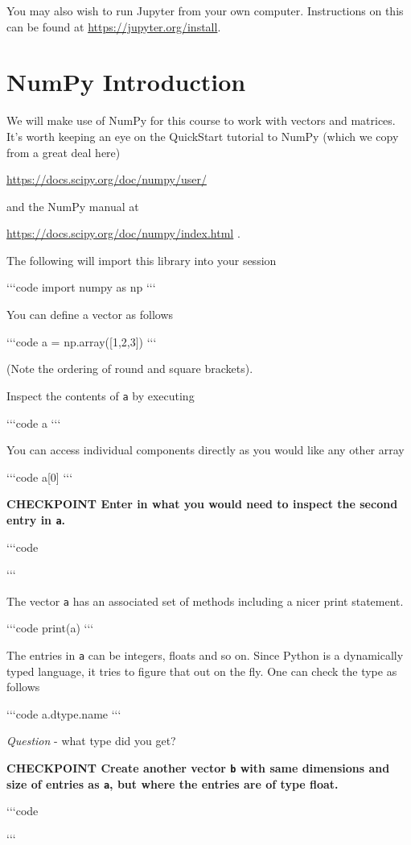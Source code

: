\documentclass[11pt]{amsart}
\newcommand{\cli}[1]{`{}`{}`{}code
#1 
`{}`{}`{}}
\newcommand{\checkpoint}[1]{{\bf CHECKPOINT \newline #1 \newline} 

`{}`{}`{}code
 
`{}`{}`{}
}
\begin{document}
You may also wish to run Jupyter from your own computer. Instructions on this can be found at 
\url{https://jupyter.org/install}.
 

\section{NumPy Introduction}

 We will make use of NumPy for this course to work with vectors and matrices. It's worth keeping an eye on the QuickStart tutorial to NumPy (which we copy from a great deal here) 
 
 \url{https://docs.scipy.org/doc/numpy/user/}

 and the NumPy manual at 

 \url{https://docs.scipy.org/doc/numpy/index.html} .

The following will import this library into your session 
 
 \cli{import numpy as np} 
 
 
You can define a vector as follows 

\cli{a = np.array([1,2,3])} 

(Note the ordering of round and square brackets).


Inspect the contents of {\tt a} by executing

\cli{a} 

 You can access individual components directly as you would like any other array

\cli{a[0]}


\checkpoint{Enter in what you would need to inspect the second entry in {\tt a}.}


The vector {\tt a} has an associated set of methods including a nicer print statement. 

\cli{print(a)}

The entries in {\tt a} can be integers, floats and so on.
  Since Python is a dynamically typed language, it tries to figure that out on the fly. One can check the type as follows 
  
  \cli{a.dtype.name}
  
{\it Question} - what type did you get? 
  
\checkpoint{Create another vector {\tt b} with same dimensions and size of entries as {\tt a}, 
but where the entries are of type float.}
\end{document}
